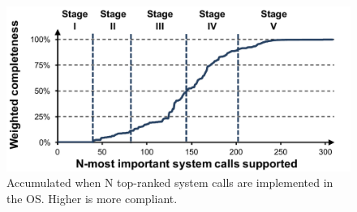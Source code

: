 \begin{figure}[t]
\centering
\includegraphics[width=5in]{syspop/figures/syscall-compatibility.pdf}
\caption[Accumulated compatibility of system prototype prioritzed by importance]
{Accumulated \compatmetric{} when N top-ranked system calls are implemented in the OS. Higher is more compliant.}
\label{fig:syscall-compatibility}
\end{figure}

\begin{table}[t]
\footnotesize
\caption[Proposed steps of Linux system call implemetation prioritzed by importance]
{Five stages of implementing system calls based on the \usagemetric{} ranking. For each stage, a set of system calls is listed, with the work needed to accomplish (\# of system calls) and the \compatmetric{} that can be reached.}
\label{table:syscall-stage}
\end{table}

